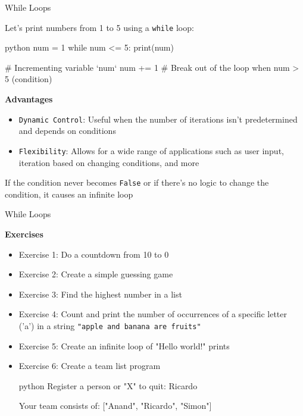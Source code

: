 \documentclass[
	11pt, 
]{beamer}
\begin{document}
\begin{frame}[fragile]{While Loops}

Let's print numbers from 1 to 5 using a \texttt{while} loop:

\begin{mintedbox}{python}
num = 1
while num <= 5:
    print(num)
    
    # Incrementing variable `num` 
    num += 1 
    # Break out of the loop when num > 5 (condition)
\end{mintedbox}

\begin{block}{\textbf{Advantages}}
    \begin{itemize}
        \item \texttt{Dynamic Control}: Useful when the number of iterations isn't predetermined and depends on conditions

        \item \texttt{Flexibility}: Allows for a wide range of applications such as user input, iteration based on changing conditions, and more

    \end{itemize}
\end{block}

 If the condition never becomes \texttt{False} or if there's no logic to change the condition, it causes an infinite loop

\end{frame}


\begin{frame}[fragile]{While Loops}

\begin{alertblock}{\textbf{Exercises}}
\begin{itemize}
    \item Exercise 1: Do a countdown from 10 to 0
    \item Exercise 2: Create a simple guessing game
    \item Exercise 3: Find the highest number in a list
    \item Exercise 4: Count and print the number of occurrences of a specific letter ('a') in a string \texttt{"apple and banana are fruits"}
    \item Exercise 5: Create an infinite loop of "Hello world!" prints
    \item Exercise 6: Create a team list program
    \begin{center}
    \begin{mintedbox}{python}
Register a person or "X" to quit: 
Ricardo

Your team consists of:
["Anand", "Ricardo", "Simon"]
    \end{mintedbox}
    \end{center}
\end{itemize}    
\end{alertblock}
\end{frame}
\end{document}
